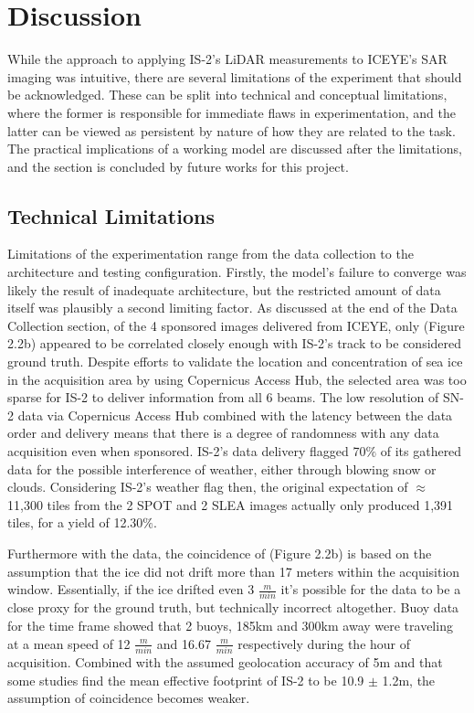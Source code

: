 \chapter{Discussion}
\label{sec:Discussion}
While the approach to applying IS-2's LiDAR measurements to ICEYE's SAR imaging was intuitive, there are several limitations of the experiment that should be acknowledged. These can be split into technical and conceptual limitations, where the former is responsible for immediate flaws in experimentation, and the latter can be viewed as persistent by nature of how they are related to the task. The practical implications of a working model are discussed after the limitations, and the section is concluded by future works for this project.

\section{Technical Limitations}
Limitations of the experimentation range from the data collection to the architecture and testing configuration. Firstly, the model's failure to converge was likely the result of inadequate architecture, but the restricted amount of data itself was plausibly a second limiting factor. As discussed at the end of the Data Collection section, of the 4 sponsored images delivered from ICEYE, only (Figure 2.2b) appeared to be correlated closely enough with IS-2's track to be considered ground truth. Despite efforts to validate the location and concentration of sea ice in the acquisition area by using Copernicus Access Hub, the selected area was too sparse for IS-2 to deliver information from all 6 beams. The low resolution of SN-2 data via Copernicus Access Hub combined with the latency between the data order and delivery means that there is a degree of randomness with any data acquisition even when sponsored. IS-2's data delivery flagged 70$\%$ of its gathered data for the possible interference of weather, either through blowing snow or clouds. Considering IS-2's weather flag then, the original expectation of $\approx$ 11,300 tiles from the 2 SPOT and 2 SLEA images actually only produced 1,391 tiles, for a yield of 12.30$\%$.

Furthermore with the data, the coincidence of (Figure 2.2b) is based on the assumption that the ice did not drift more than 17 meters within the acquisition window. Essentially, if the ice drifted even 3 $\frac{m}{min}$ it's possible for the data to be a close proxy for the ground truth, but technically incorrect altogether. Buoy data for the time frame showed that 2 buoys, 185km and 300km away were traveling at a mean speed of 12 $\frac{m}{min}$ and 16.67 $\frac{m}{min}$ respectively during the hour of acquisition. Combined with the assumed geolocation accuracy of 5m \cite{ICESat-2-Horizontal-Accuracy} and that some studies find the mean effective footprint of IS-2 to be 10.9 $\pm$ 1.2m\cite{icesatfootprintdiameter}, the assumption of coincidence becomes weaker.

